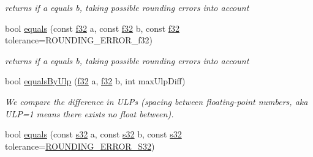 \begin{DoxyCompactItemize}
\begin{DoxyCompactList}\small\item\em returns if a equals b, taking possible rounding errors into account \end{DoxyCompactList}\item 
bool \hyperlink{namespaceirr_1_1core_ae9c63fd2065e6afd30b4537166706ddf}{equals} (const \hyperlink{namespaceirr_a0277be98d67dc26ff93b1a6a1d086b07}{f32} a, const \hyperlink{namespaceirr_a0277be98d67dc26ff93b1a6a1d086b07}{f32} b, const \hyperlink{namespaceirr_a0277be98d67dc26ff93b1a6a1d086b07}{f32} tolerance=R\+O\+U\+N\+D\+I\+N\+G\+\_\+\+E\+R\+R\+O\+R\+\_\+f32)\hypertarget{namespaceirr_1_1core_ae9c63fd2065e6afd30b4537166706ddf}{}\label{namespaceirr_1_1core_ae9c63fd2065e6afd30b4537166706ddf}

\begin{DoxyCompactList}\small\item\em returns if a equals b, taking possible rounding errors into account \end{DoxyCompactList}\item 
bool \hyperlink{namespaceirr_1_1core_a730a85283e04b33debcf3b755e5b7603}{equals\+By\+Ulp} (\hyperlink{namespaceirr_a0277be98d67dc26ff93b1a6a1d086b07}{f32} a, \hyperlink{namespaceirr_a0277be98d67dc26ff93b1a6a1d086b07}{f32} b, int max\+Ulp\+Diff)\hypertarget{namespaceirr_1_1core_a730a85283e04b33debcf3b755e5b7603}{}\label{namespaceirr_1_1core_a730a85283e04b33debcf3b755e5b7603}

\begin{DoxyCompactList}\small\item\em We compare the difference in U\+LP\textquotesingle{}s (spacing between floating-\/point numbers, aka U\+LP=1 means there exists no float between). \end{DoxyCompactList}\item 
bool \hyperlink{namespaceirr_1_1core_afe4784d5bf091acce7777c40c4010ff8}{equals} (const \hyperlink{namespaceirr_ac66849b7a6ed16e30ebede579f9b47c6}{s32} a, const \hyperlink{namespaceirr_ac66849b7a6ed16e30ebede579f9b47c6}{s32} b, const \hyperlink{namespaceirr_ac66849b7a6ed16e30ebede579f9b47c6}{s32} tolerance=\hyperlink{namespaceirr_1_1core_aac9f99b6a999bdf25fec402c59e8342a}{R\+O\+U\+N\+D\+I\+N\+G\+\_\+\+E\+R\+R\+O\+R\+\_\+\+S32})\hypertarget{namespaceirr_1_1core_afe4784d5bf091acce7777c40c4010ff8}{}\label{namespaceirr_1_1core_afe4784d5bf091acce7777c40c4010ff8}


\end{DoxyCompactItemize}
